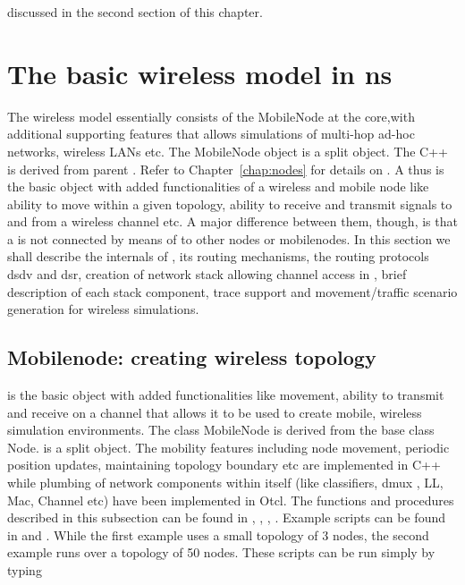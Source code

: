  discussed in the second section of this chapter.		


\section{The basic wireless model in ns}
\label{sec:basic-model}

The wireless model essentially consists of the MobileNode at the core,with
additional supporting features that allows simulations of multi-hop ad-hoc
networks, wireless LANs etc. The MobileNode object is a split object. The
C++  is derived from parent
. Refer to Chapter~\ref{chap:nodes} for
details on . A  thus is the basic 
object with added functionalities of a wireless and mobile node like
ability to move within a given topology, ability to receive and transmit
signals to and from a wireless channel etc. A major difference between
them, though, is that a  is not connected by means of
 to other nodes or mobilenodes. In this section we shall
describe the internals of , its routing mechanisms, the
routing protocols dsdv and dsr, creation of network stack allowing channel
access in , brief description of each stack component,
trace support and movement/traffic scenario generation for wireless
simulations. 


\subsection{Mobilenode: creating wireless topology}
\label{sec:mobilenode-creation}

 is the basic \ns {} object with added
functionalities like movement, ability to transmit and receive on a
channel that allows it to be used to create mobile, wireless simulation
environments. The class MobileNode is derived from the base class Node.
 is a split object. The mobility features including node
movement, periodic position updates, maintaining topology boundary etc are
implemented in C++ while plumbing of network components within
 itself (like classifiers, dmux , LL, Mac, Channel etc)
have been implemented in Otcl. The functions and procedures described in
this subsection can be found in ,
, ,
. Example scripts can be found in
 and . While the
first example uses a small topology of 3 nodes, the second example runs
over a topology of 50 nodes. These scripts can be run simply by typing


